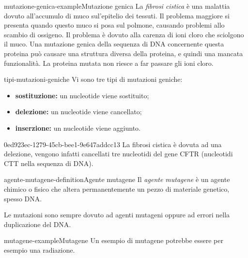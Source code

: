 \documentclass[preview]{standalone}
\begin{document}
\begin{snippetexample}{mutazione-genica-example}{Mutazione genica}
    La \textit{fibrosi cistica} è una malattia dovuto all'accumulo di muco sul'epitelio dei tessuti.
    Il problema maggiore si presenta quando questo muco si posa sul polmone, causando problemi
    allo scambio di ossigeno. Il problema è dovuto alla carenza di ioni cloro che sciolgono il muco.
    Una mutazione genica della sequenza di DNA concernente questa proteina può causare
    una struttura diversa della proteina, e quindi una mancata funzionalità. La proteina mutata
    non riesce a far passare gli ioni cloro.
\end{snippetexample}

\begin{snippet}{tipi-mutazioni-geniche}
    Vi sono tre tipi di mutazioni geniche:
    \begin{itemize}
        \item \textbf{sostituzione:} un nucleotide viene sostituito;
        \item \textbf{delezione:} un nucleotide viene cancellato;
        \item \textbf{inserzione:} un nucleotide viene aggiunto.
    \end{itemize}
\end{snippet}

\begin{snippet}{0ed923ec-1279-45cb-bee1-9e647addcc13}
    La fibrosi cistica è dovuta ad una delezione, vengono infatti cancellati tre nucleotidi
    del gene CFTR (nucleotidi CTT nella sequenza di DNA).
\end{snippet}

\begin{snippetdefinition}{agente-mutagene-definition}{Agente mutagene}
    Il \textit{agente mutagene} è un agente chimico o fisico che altera permanentemente
    un pezzo di materiale genetico, spesso DNA.
\end{snippetdefinition}

\begin{plainhtml}
    Le mutazioni sono sempre dovuto ad agenti mutageni oppure ad errori nella duplicazione del DNA.
\end{plainhtml}

\begin{snippetexample}{mutagene-example}{Mutagene}
    Un esempio di mutagene potrebbe essere per esempio una radiazione.
\end{snippetexample}
\end{document}
